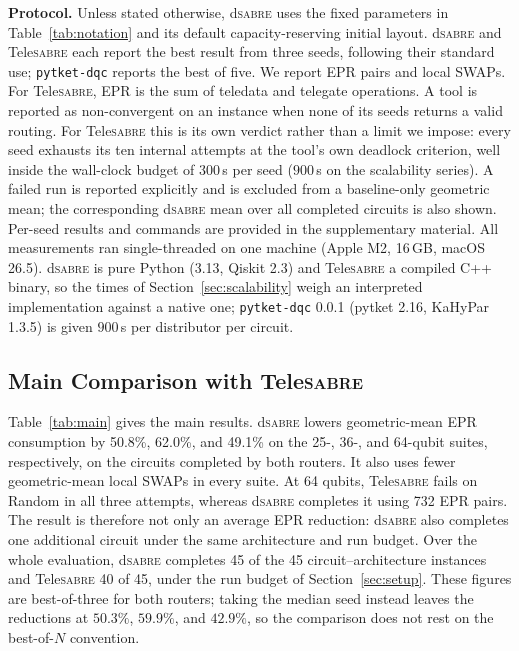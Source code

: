 \documentclass[journal]{IEEEtran}
\newcommand{\dSABRE}{d\textsc{sabre}}
\newcommand{\TeleSABRE}{Tele\textsc{sabre}}
\begin{document}
\textbf{Protocol.} Unless stated otherwise, \dSABRE{} uses the fixed parameters in Table~\ref{tab:notation} and its default capacity-reserving initial layout.  \dSABRE{} and \TeleSABRE{} each report the best result from three seeds, following their standard use; \texttt{pytket-dqc} reports the best of five.  We report EPR pairs and local SWAPs.  For \TeleSABRE{}, EPR is the sum of teledata and telegate operations.  A tool is reported as non-convergent on an instance when none of its seeds returns a valid routing.  For \TeleSABRE{} this is its own verdict rather than a limit we impose: every seed exhausts its ten internal attempts at the tool's own deadlock criterion, well inside the wall-clock budget of $300$\,s per seed ($900$\,s on the scalability series).  A failed run is reported explicitly and is excluded from a baseline-only geometric mean; the corresponding \dSABRE{} mean over all completed circuits is also shown.  Per-seed results and commands are provided in the supplementary material.  All measurements ran single-threaded on one machine (Apple M2, 16\,GB, macOS 26.5).  \dSABRE{} is pure Python (3.13, Qiskit 2.3) and \TeleSABRE{} a compiled C++ binary, so the times of Section~\ref{sec:scalability} weigh an interpreted implementation against a native one; \texttt{pytket-dqc} 0.0.1 (pytket 2.16, KaHyPar 1.3.5) is given $900$\,s per distributor per circuit.

\subsection{Main Comparison with \TeleSABRE{}}
\label{sec:mainresults}

Table~\ref{tab:main} gives the main results.  \dSABRE{} lowers geometric-mean EPR consumption by 50.8\%, 62.0\%, and 49.1\% on the 25-, 36-, and 64-qubit suites, respectively, on the circuits completed by both routers.  It also uses fewer geometric-mean local SWAPs in every suite.  At 64 qubits, \TeleSABRE{} fails on Random in all three attempts, whereas \dSABRE{} completes it using 732 EPR pairs.  The result is therefore not only an average EPR reduction: \dSABRE{} also completes one additional circuit under the same architecture and run budget.  Over the whole evaluation, \dSABRE{} completes 45 of the 45 circuit--architecture instances and \TeleSABRE{} 40 of 45, under the run budget of Section~\ref{sec:setup}.  These figures are best-of-three for both routers; taking the median seed instead leaves the reductions at $50.3\%$, $59.9\%$, and $42.9\%$, so the comparison does not rest on the best-of-$N$ convention.
\end{document}
